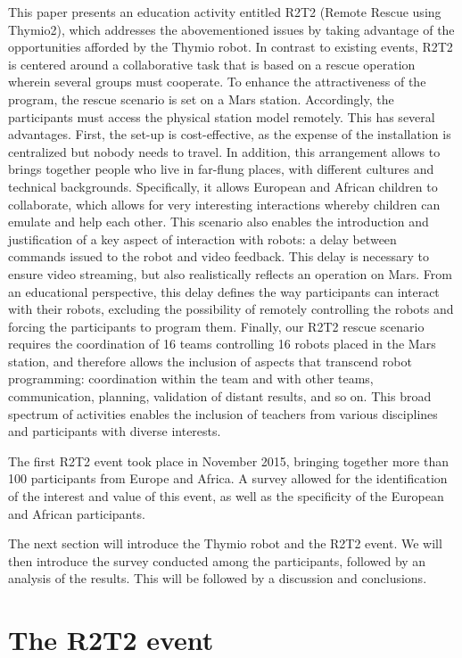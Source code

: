 \documentclass{intech-journal}
\begin{document}
This paper presents an education activity entitled R2T2 (Remote Rescue using Thymio2), which addresses the abovementioned issues by taking advantage of the opportunities afforded by the Thymio robot. 
In contrast to existing events, R2T2 is centered around a collaborative task that is based on a rescue operation wherein several groups must cooperate.
To enhance the attractiveness of the program, the rescue scenario is set on a Mars station. 
Accordingly, the participants must access the physical station model remotely.
This has several advantages. 
First, the set-up is cost-effective, as the expense of the installation is centralized but nobody needs to travel.
In addition, this arrangement allows to brings together people who live in far-flung places, with different cultures and technical backgrounds. 
Specifically, it allows European and African children to collaborate, which allows for very interesting interactions whereby children can emulate and help each other.
This scenario also enables the introduction and justification of a key aspect of interaction with robots: a delay between commands issued to the robot and video feedback. 
This delay is necessary to ensure video streaming, but also realistically reflects an operation on Mars.
From an educational perspective, this delay defines the way participants can interact with their robots, excluding the possibility of remotely controlling the robots and forcing the participants to program them.
Finally, our R2T2 rescue scenario requires the coordination of 16 teams controlling 16 robots placed in the Mars station, and therefore allows the inclusion of aspects that transcend robot programming: coordination within the team and with other teams, communication, planning, validation of distant results, and so on.
This broad spectrum of activities enables the inclusion of teachers from various disciplines and participants with diverse interests.

The first R2T2 event took place in November 2015, bringing together more than 100 participants from Europe and Africa. 
A survey allowed for the identification of the interest and value of this event, as well as the specificity of the European and African participants.

The next section will introduce the Thymio robot and the R2T2 event. 
We will then introduce the survey conducted among the participants, followed by an analysis of the results. 
This will be followed by a discussion and conclusions.


\section{The R2T2 event}
\end{document}
